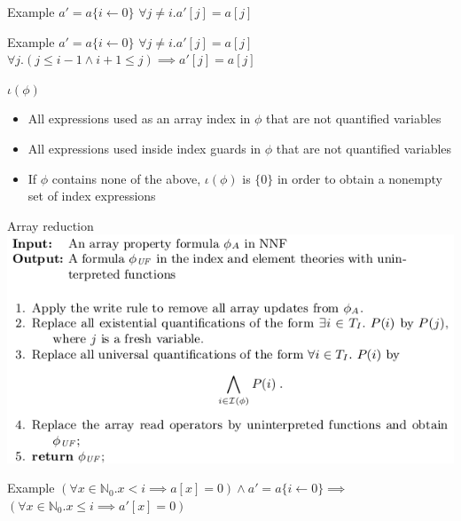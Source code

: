 \documentclass{beamer}
\begin{document}
\begin{frame}{Example}
$a' = a\{i\leftarrow 0\}$\newline
$\forall j \ne i. a'[j] = a[j]$\newline
\end{frame}

\begin{frame}{Example}
$a' = a\{i\leftarrow 0\}$\newline
$\forall j \ne i. a'[j] = a[j]$\newline
$\forall j. (j \le i - 1 \wedge i + 1 \le j) \implies a'[j] = a[j]$
\end{frame}

\begin{frame}{$\iota(\phi)$}
\begin{block}{}
\begin{itemize}
\item All expressions used as an array index in $\phi$ that are not quantified variables
\item All expressions used inside index guards in $\phi$ that are not quantified variables
\item If $\phi$ contains none of the above, $\iota(\phi)$ is $\{0\}$ in order to obtain a nonempty set of index expressions
\end{itemize}
\end{block}
\end{frame}

\begin{frame}{Array reduction}
\includegraphics[scale=0.5]{array-reduction.png}
\end{frame}

\begin{frame}{Example}
$(\forall x \in \mathbb{N}_0. x < i \implies a[x] = 0) \wedge a' = a\{i\leftarrow 0\} \implies$\newline
$(\forall x \in \mathbb{N}_0. x \le i \implies a'[x] = 0)$
\end{frame}
\end{document}

